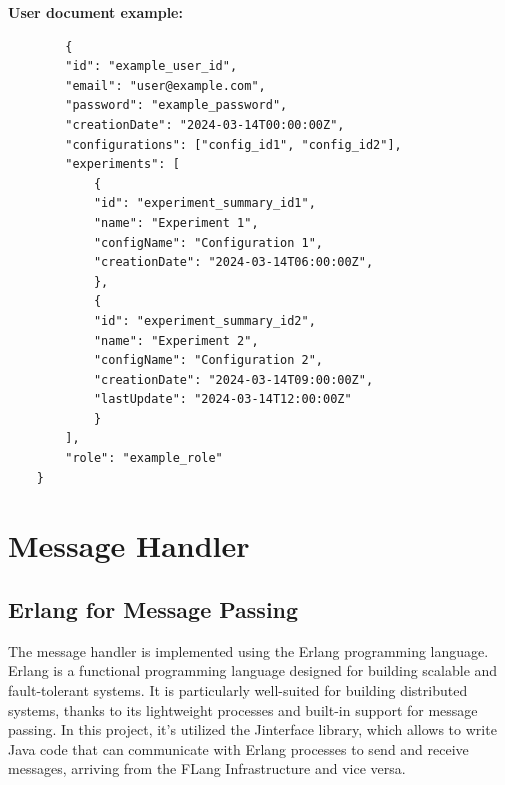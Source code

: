 \newpage
\textbf{User document example:} \begin{verbatim}
        {
        "id": "example_user_id",
        "email": "user@example.com",
        "password": "example_password",
        "creationDate": "2024-03-14T00:00:00Z",
        "configurations": ["config_id1", "config_id2"],
        "experiments": [
            {
            "id": "experiment_summary_id1",
            "name": "Experiment 1",
            "configName": "Configuration 1",
            "creationDate": "2024-03-14T06:00:00Z",
            },
            {
            "id": "experiment_summary_id2",
            "name": "Experiment 2",
            "configName": "Configuration 2",
            "creationDate": "2024-03-14T09:00:00Z",
            "lastUpdate": "2024-03-14T12:00:00Z"
            }
        ],
        "role": "example_role"
    }

    \end{verbatim}
\newpage
\section{Message Handler}

\subsection{Erlang for Message Passing}
The message handler is implemented using the Erlang programming language. Erlang is a functional programming language designed for building scalable and fault-tolerant systems. It is particularly well-suited for building distributed systems, thanks to its lightweight processes and built-in support for message passing. In this project, it's utilized the Jinterface library, which allows to write Java code that can communicate with Erlang processes to send and receive messages, arriving from the FLang Infrastructure and vice versa.

